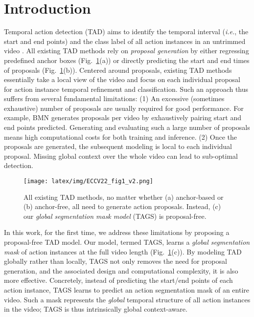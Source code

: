 \documentclass[runningheads]{llncs}
\newcommand{\ie}{\textit{i.e.}}
\newcommand{\shortmodelname}{TAGS}
\begin{document}
\section{Introduction}
\label{sec:intro}
Temporal action detection (TAD) aims to identify the temporal interval (\ie, the start and end points) and the class label of all action instances in an untrimmed video \cite{idrees2017thumos,caba2015activitynet}. 
All existing TAD methods 
rely on {\em proposal generation} by either 
regressing predefined anchor boxes 
\cite{xu2017r,chao2018rethinking,gao2017turn,long2019gaussian}
(Fig.~\ref{fig:design}(a))
or 
directly predicting the start and end times of proposals
\cite{lin2019bmn,buch2017sst,lin2018bsn,xu2020g,nag2021few,xu2021boundary,xu2021low}
(Fig.~\ref{fig:design}(b)).
Centered around proposals, existing TAD methods essentially take a local view of the video and focus on each individual proposal for action instance temporal refinement and classification. Such an approach thus
suffers from
several fundamental limitations:
{(1)} An excessive (sometimes exhaustive) number of proposals are usually required
for good performance.
For example, BMN \cite{lin2019bmn} generates  proposals per video
by exhaustively pairing start and end points predicted. Generating and evaluating such a large number of proposals means high computational costs for both training and inference.
{(2)}  Once the proposals are generated, the subsequent modeling is local to each individual proposal. Missing global context over the whole video can lead to sub-optimal detection. 

\begin{figure}[!t]
\begin{center}
  \texttt{[image: latex/img/ECCV22\_fig1\_v2.png]}
\end{center}
\caption{All existing TAD methods,  no matter whether (a) anchor-based or (b) anchor-free,  all
need to generate action proposals.
Instead, (c) our {\em global segmentation mask model} ({\shortmodelname}) is proposal-free.
}
\label{fig:design}
\end{figure}


In this work, for the first time, we address these limitations by proposing a proposal-free  TAD model. Our model, termed {\shortmodelname},  learns  a {\em global segmentation mask} of action instances at the full video length (Fig.~\ref{fig:design}(c)). By modeling TAD globally rather than locally, {\shortmodelname} not only removes the need for proposal generation, and the associated design and computational complexity, it is also more effective.  
Concretely, 
instead of predicting the start/end points of each action instance,
{\shortmodelname} learns to predict an action segmentation mask of an entire video. Such a mask represents the {\em global} temporal structure of all action instances in the video; {\shortmodelname} is thus intrinsically global context-aware. 
\end{document}
